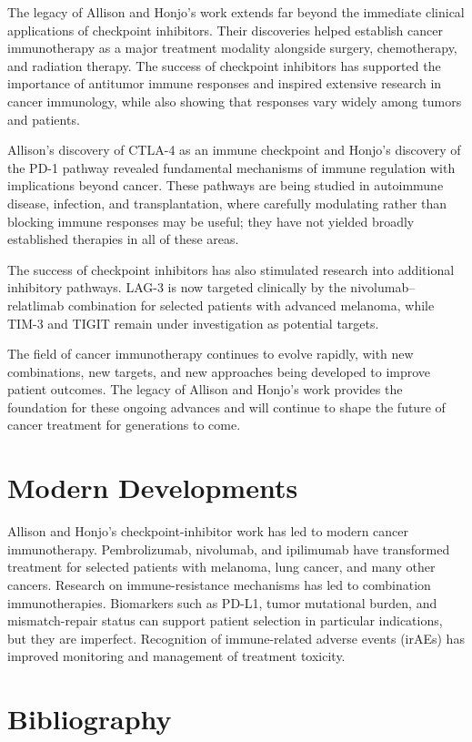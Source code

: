 The legacy of Allison and Honjo's work extends far beyond the immediate clinical applications of checkpoint inhibitors. Their discoveries helped establish cancer immunotherapy as a major treatment modality alongside surgery, chemotherapy, and radiation therapy. The success of checkpoint inhibitors has supported the importance of antitumor immune responses and inspired extensive research in cancer immunology, while also showing that responses vary widely among tumors and patients.

Allison's discovery of CTLA-4 as an immune checkpoint and Honjo's discovery of the PD-1 pathway revealed fundamental mechanisms of immune regulation with implications beyond cancer. These pathways are being studied in autoimmune disease, infection, and transplantation, where carefully modulating rather than blocking immune responses may be useful; they have not yielded broadly established therapies in all of these areas.

The success of checkpoint inhibitors has also stimulated research into additional inhibitory pathways. LAG-3 is now targeted clinically by the nivolumab--relatlimab combination for selected patients with advanced melanoma, while TIM-3 and TIGIT remain under investigation as potential targets.

The field of cancer immunotherapy continues to evolve rapidly, with new combinations, new targets, and new approaches being developed to improve patient outcomes. The legacy of Allison and Honjo's work provides the foundation for these ongoing advances and will continue to shape the future of cancer treatment for generations to come.


\section{Modern Developments}

Allison and Honjo's checkpoint-inhibitor work has led to modern cancer immunotherapy. Pembrolizumab, nivolumab, and ipilimumab have transformed treatment for selected patients with melanoma, lung cancer, and many other cancers. Research on immune-resistance mechanisms has led to combination immunotherapies. Biomarkers such as PD-L1, tumor mutational burden, and mismatch-repair status can support patient selection in particular indications, but they are imperfect. Recognition of immune-related adverse events (irAEs) has improved monitoring and management of treatment toxicity.


\section{Bibliography}

